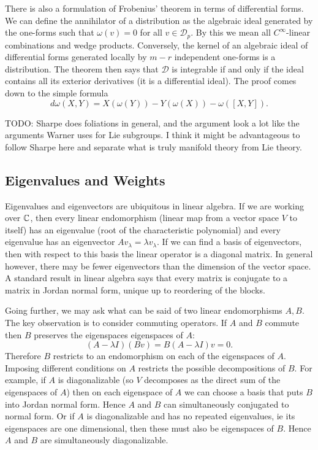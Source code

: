 There is also a formulation of Frobenius' theorem in terms of differential forms.
We can define the annihilator of a distribution as the algebraic ideal generated by the one-forms such that $\omega(v) = 0$ for all $v \in \mathcal{D}_p$.
By this we mean all $C^\infty$-linear combinations and wedge products.
Conversely, the kernel of an algebraic ideal of differential forms generated locally by $m-r$ independent one-forms is a distribution.
The theorem then says that $\mathcal{D}$ is integrable if and only if the ideal contains all its exterior derivatives (it is a differential ideal).
The proof comes down to the simple formula
\[
d\omega(X,Y) = X(\omega(Y)) - Y(\omega(X)) - \omega([X,Y]).
\]

TODO: Sharpe does foliations in general, and the argument look a lot like the arguments Warner uses for Lie subgroups.
I think it might be advantageous to follow Sharpe here and separate what is truly manifold theory from Lie theory.



\subsection{Eigenvalues and Weights}

Eigenvalues and eigenvectors are ubiquitous in linear algebra.
If we are working over $\mathbb{C}$, then every linear endomorphism (linear map from a vector space $V$ to itself) has an eigenvalue (root of the characteristic polynomial) and every eigenvalue has an eigenvector $Av_\lambda = \lambda v_\lambda$.
If we can find a basis of eigenvectors, then with respect to this basis the linear operator is a diagonal matrix.
In general however, there may be fewer eigenvectors than the dimension of the vector space.
A standard result in linear algebra says that every matrix is conjugate to a matrix in Jordan normal form, unique up to reordering of the blocks.

Going further, we may ask what can be said of two linear endomorphisms $A,B$.
The key observation is to consider commuting operators.
If $A$ and $B$ commute then $B$ preserves the eigenspaces  eigenspaces of $A$:
\[
(A- \lambda I) (Bv) 
= B(A- \lambda I) v
= 0.
\]
Therefore $B$ restricts to an endomorphism on each of the eigenspaces of $A$.
Imposing different conditions on $A$ restricts the possible decompositions of $B$.
For example, if $A$ is diagonalizable (so $V$ decomposes as the direct sum of the eigenspaces of $A$) then on each eigenspace of $A$ we can choose a basis that puts $B$ into Jordan normal form.
Hence $A$ and $B$ can simultaneously conjugated to normal form.
Or if $A$ is diagonalizable and has no repeated eigenvalues, ie its eigenspaces are one dimensional, then these must also be eigenspaces of $B$.
Hence $A$ and $B$ are simultaneously diagonalizable.

